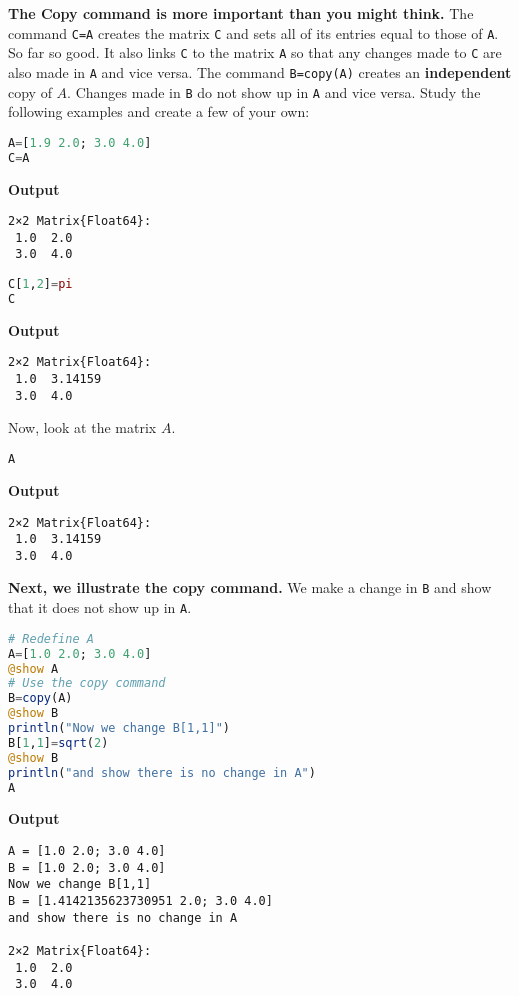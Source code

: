 \textbf{The Copy command is more important than you might think.} The command \texttt{C=A} creates the matrix \texttt{C} and sets all of its entries equal to those of \texttt{A}. So far so good. It also links \texttt{C} to the matrix \texttt{A} so that any changes made to \texttt{C} are also made in \texttt{A} and vice versa. The command \texttt{B=copy(A)} creates an \textbf{independent} copy of $A$. Changes made in \texttt{B} do not show up in \texttt{A} and vice versa. Study the following examples and create a few of your own:\\

\begin{lstlisting}[language=Julia,style=mystyle]
A=[1.9 2.0; 3.0 4.0]
C=A
\end{lstlisting}
\textbf{Output} 
\begin{verbatim}
2×2 Matrix{Float64}:
 1.0  2.0
 3.0  4.0
\end{verbatim}

\begin{lstlisting}[language=Julia,style=mystyle]
C[1,2]=pi
C
\end{lstlisting}
\textbf{Output} 
\begin{verbatim}
2×2 Matrix{Float64}:
 1.0  3.14159
 3.0  4.0
\end{verbatim}

Now, look at the matrix $A$. \\
\begin{lstlisting}[language=Julia,style=mystyle]
A
\end{lstlisting}
\textbf{Output} 
\begin{verbatim}
2×2 Matrix{Float64}:
 1.0  3.14159
 3.0  4.0
\end{verbatim}

\textbf{Next, we illustrate the copy command.} We make a change in \texttt{B} and show that it does not show up in \texttt{A}.\\
\begin{lstlisting}[language=Julia,style=mystyle]
# Redefine A
A=[1.0 2.0; 3.0 4.0]
@show A
# Use the copy command
B=copy(A)
@show B
println("Now we change B[1,1]")
B[1,1]=sqrt(2)
@show B
println("and show there is no change in A")
A
\end{lstlisting}
\textbf{Output} 
\begin{verbatim}
A = [1.0 2.0; 3.0 4.0]
B = [1.0 2.0; 3.0 4.0]
Now we change B[1,1]
B = [1.4142135623730951 2.0; 3.0 4.0]
and show there is no change in A

2×2 Matrix{Float64}:
 1.0  2.0
 3.0  4.0
\end{verbatim}

